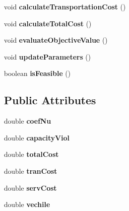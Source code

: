 \begin{DoxyCompactItemize}
\item 
void {\bfseries calculate\+Transportation\+Cost} ()\hypertarget{classtabu_1_1_my_solution_ac8ade7cfa3d398f975d11440f1a2f6cb}{}\label{classtabu_1_1_my_solution_ac8ade7cfa3d398f975d11440f1a2f6cb}

\item 
void {\bfseries calculate\+Total\+Cost} ()\hypertarget{classtabu_1_1_my_solution_a60d6acab214d6dfc69a500ba80421883}{}\label{classtabu_1_1_my_solution_a60d6acab214d6dfc69a500ba80421883}

\item 
void {\bfseries evaluate\+Objective\+Value} ()\hypertarget{classtabu_1_1_my_solution_a63e126deace1ad32067060d68f0d0efc}{}\label{classtabu_1_1_my_solution_a63e126deace1ad32067060d68f0d0efc}

\item 
void {\bfseries update\+Parameters} ()\hypertarget{classtabu_1_1_my_solution_af7943595b0aadc53ac592a7f5e3c49f4}{}\label{classtabu_1_1_my_solution_af7943595b0aadc53ac592a7f5e3c49f4}

\item 
boolean {\bfseries is\+Feasible} ()\hypertarget{classtabu_1_1_my_solution_a8e9a3dfb8b901c52cd81a9665be09a4f}{}\label{classtabu_1_1_my_solution_a8e9a3dfb8b901c52cd81a9665be09a4f}

\end{DoxyCompactItemize}
\subsection*{Public Attributes}
\begin{DoxyCompactItemize}
\item 
double {\bfseries coef\+Nu}\hypertarget{classtabu_1_1_my_solution_a8ad0a95687bdc6935b54f092bb0c1465}{}\label{classtabu_1_1_my_solution_a8ad0a95687bdc6935b54f092bb0c1465}

\item 
double {\bfseries capacity\+Viol}\hypertarget{classtabu_1_1_my_solution_a5c18a9cfe2ca844257c379609fb9fd97}{}\label{classtabu_1_1_my_solution_a5c18a9cfe2ca844257c379609fb9fd97}

\item 
double {\bfseries total\+Cost}\hypertarget{classtabu_1_1_my_solution_a9255fc95dc1723cee4c65f957d4535a2}{}\label{classtabu_1_1_my_solution_a9255fc95dc1723cee4c65f957d4535a2}

\item 
double {\bfseries tran\+Cost}\hypertarget{classtabu_1_1_my_solution_a94a156175be66a977cc0079272068465}{}\label{classtabu_1_1_my_solution_a94a156175be66a977cc0079272068465}

\item 
double {\bfseries serv\+Cost}\hypertarget{classtabu_1_1_my_solution_a999e32fef42b67ee3c96fa9029815d28}{}\label{classtabu_1_1_my_solution_a999e32fef42b67ee3c96fa9029815d28}

\item 
double {\bfseries vechile}\hypertarget{classtabu_1_1_my_solution_a6d55c8dfe45b58e9288e02f7999c4345}{}\label{classtabu_1_1_my_solution_a6d55c8dfe45b58e9288e02f7999c4345}

\end{DoxyCompactItemize}


